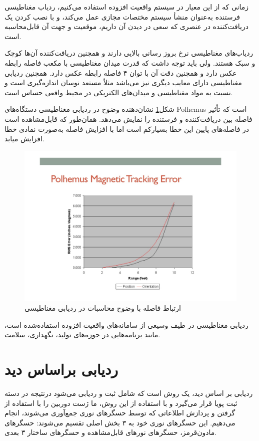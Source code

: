 زمانی که از این معیار در سیستم واقعیت افزوده استفاده می‌کنیم، ردیاب مغناطیسی فرستنده به‌عنوان منشأ سیستم مختصات مجازی عمل می‌کند، و با نصب کردن یک دریافت‌کننده در عنصری که سعی در دیدن آن داریم، موقعیت و جهت آن قابل‌محاسبه است\cite{caudell1992augmented}. 

ردیاب‌های مغناطیسی نرخ بروز رسانی بالایی دارند و همچنین دریافت‌کننده آن‌ها کوچک و سبک هستند. ولی باید توجه داشت که قدرت میدان مغناطیسی با مکعب فاصله رابطه عکس دارد و همچنین دقت آن با توان ۴ فاصله رابطه عکس دارد. همچنین ردیابی مغناطیسی دارای معایب دیگری نیز می‌باشد مثلاً مستعد نوسان اندازه‌گیری است و نسبت به مواد مغناطیسی و میدان‌های الکتریکی در محیط واقعی حساس است.

شکل\ref{fig:magnetic} نشان‌دهنده وضوح در ردیابی مغناطیسی دستگاه‌های Polhemus است که تأثیر فاصله بین دریافت‌کننده و فرستنده را نمایش می‌دهد. همان‌طور که قابل‌مشاهده است در فاصله‌های پایین این خطا بسیارکم است اما با افزایش فاصله به‌صورت نمادی خطا افزایش میابد.
\begin{figure}
	\centering
	\includegraphics[width=1\linewidth]{image/magnetic}
	\caption {ارتباط فاصله با وضوح محاسبات در ردیابی مغناطیسی\protect{}}
	\label{fig:magnetic}
\end{figure}
ردیابی مغناطیسی در طیف وسیعی از سامانه‌های واقعیت افزوده استفاده‌شده است، مانند برنامه‌هایی در حوزه‌های تولید\cite{caudell1992augmented}، نگهداری\cite{feiner1993knowledge}، سلامت\cite{bajura1992merging}.
\section{ردیابی براساس دید\protect{}}
ردیابی بر اساس دید، یک روش است که شامل ثبت و ردیابی می‌شود درنتیجه در دسته ثبت پویا قرار می‌گیرد و با استفاده از این روش، ما ژست دوربین را با استفاده از گرفتن و پردازش اطلاعاتی که توسط حسگرهای نوری جمع‌آوری می‌شوند، انجام می‌دهیم. این حسگرهای نوری خود به ۳ بخش اصلی تقسیم می‌شوند: حسگرهای مادون‌قرمز، حسگرهای نورهای قابل‌مشاهده و حسگرهای ساختار ۳ بعدی.

